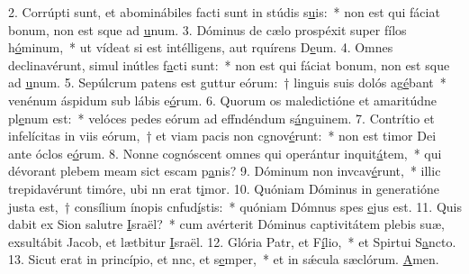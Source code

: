 2. Corrúpti sunt, et abominábiles facti sunt in stúdis s\uline{u}is:~* non est qui fáciat bonum, non est sque ad \uline{u}num.
3. Dóminus de cælo prospéxit super fílos h\uline{ó}minum,~* ut vídeat si est intélligens, aut rquírens D\uline{e}um.
4. Omnes declinavérunt, simul inútles f\uline{a}cti sunt:~* non est qui fáciat bonum, non est sque ad \uline{u}num.
5. Sepúlcrum patens est guttur eórum:~† linguis suis dolós ag\uline{é}bant~* venénum áspidum sub lábis e\uline{ó}rum.
6. Quorum os maledictióne et amaritúdne pl\uline{e}num est:~* velóces pedes eórum ad effndéndum s\uline{á}nguinem.
7. Contrítio et infelícitas in viis eórum,~† et viam pacis non cgnov\uline{é}runt:~* non est timor Dei ante óclos e\uline{ó}rum.
8. Nonne cognóscent omnes qui operántur inquit\uline{á}tem,~* qui dévorant plebem meam sict escam p\uline{a}nis?
9. Dóminum non invcav\uline{é}runt,~* illic trepidavérunt timóre, ubi nn erat t\uline{i}mor.
10. Quóniam Dóminus in generatióne justa est,~† consílium ínopis cnfud\uline{í}stis:~* quóniam Dómnus spes \uline{e}jus est.
11. Quis dabit ex Sion salutre \uline{I}sraël?~* cum avérterit Dóminus captivitátem plebis suæ, exsultábit Jacob, et lætbitur \uline{I}sraël.
12. Glória Patr, et F\uline{í}lio,~* et Spirtui S\uline{a}ncto.
13. Sicut erat in princípio, et nnc, et s\uline{e}mper,~* et in sǽcula sæclórum. \uline{A}men.

